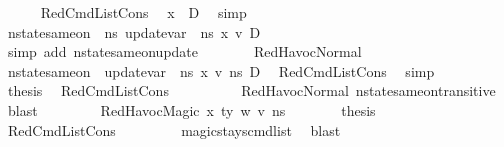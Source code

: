 \begin{isabellebody}
\ \ \ \ \isamarkupfalse%
\ RedCmdListCons\ \isamarkupfalse%
\ {\isachardoublequoteopen}x\ {\isasymin}\ D{\isachardoublequoteclose}\ \isamarkupfalse%
\ simp\isanewline
\ \ \ \ \isamarkupfalse%
\ {\isachardoublequoteopen}nstate{\isacharunderscore}{\kern0pt}same{\isacharunderscore}{\kern0pt}on\ {\isasymLambda}\ n{\isacharunderscore}{\kern0pt}s\ {\isacharparenleft}{\kern0pt}update{\isacharunderscore}{\kern0pt}var\ {\isasymLambda}\ n{\isacharunderscore}{\kern0pt}s\ x\ v{\isacharparenright}{\kern0pt}\ D{\isachardoublequoteclose}\ \isanewline
\ \ \ \ \ \ \isamarkupfalse%
\ {\isacharparenleft}{\kern0pt}simp\ add{\isacharcolon}{\kern0pt}\ nstate{\isacharunderscore}{\kern0pt}same{\isacharunderscore}{\kern0pt}on{\isacharunderscore}{\kern0pt}update{\isacharunderscore}{\kern0pt}{}{\isacharparenright}{\kern0pt}\isanewline
\ \ \ \ \isamarkupfalse%
\ \isamarkupfalse%
\ RedHavocNormal\ \isamarkupfalse%
\ {\isachardoublequoteopen}nstate{\isacharunderscore}{\kern0pt}same{\isacharunderscore}{\kern0pt}on\ {\isasymLambda}\ {\isacharparenleft}{\kern0pt}update{\isacharunderscore}{\kern0pt}var\ {\isasymLambda}\ n{\isacharunderscore}{\kern0pt}s\ x\ v{\isacharparenright}{\kern0pt}\ ns{\isacharprime}{\kern0pt}\ D{\isachardoublequoteclose}\ \isamarkupfalse%
\ RedCmdListCons\ \isamarkupfalse%
\ simp\isanewline
\ \ \ \ \isamarkupfalse%
\ \isamarkupfalse%
\ {\isacharquery}{\kern0pt}thesis\ \isamarkupfalse%
\ RedCmdListCons\ \ \isanewline
\ \ \ \ \ \ \isamarkupfalse%
\ RedHavocNormal\ nstate{\isacharunderscore}{\kern0pt}same{\isacharunderscore}{\kern0pt}on{\isacharunderscore}{\kern0pt}transitive\ \isamarkupfalse%
\ blast\isanewline
\ \ \isamarkupfalse%
\isanewline
\ \ \ \ \isamarkupfalse%
\ {\isacharparenleft}{\kern0pt}RedHavocMagic\ x\ ty\ w\ v\ n{\isacharunderscore}{\kern0pt}s{\isacharparenright}{\kern0pt}\isanewline
\ \ \ \ \isamarkupfalse%
\ \isamarkupfalse%
\ {\isacharquery}{\kern0pt}thesis\ \isamarkupfalse%
\ RedCmdListCons\ \isanewline
\ \ \ \ \ \ \isamarkupfalse%
\ magic{\isacharunderscore}{\kern0pt}stays{\isacharunderscore}{\kern0pt}cmd{\isacharunderscore}{\kern0pt}list\ \isamarkupfalse%
\ blast\isanewline
\ \ \isamarkupfalse%

\end{isabellebody}
